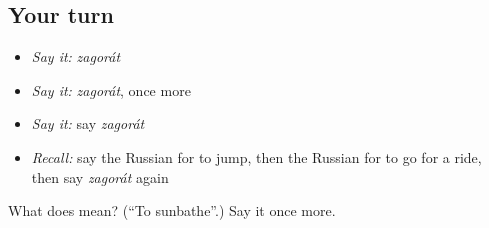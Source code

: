 \subsection*{Your turn}
\begin{itemize}
\raggedright
  \item \emph{Say it:} \emph{zagorát}
  \item \emph{Say it:} \emph{zagorát}, once more
  \item \emph{Say it:} say \emph{zagorát}
  \item \emph{Recall:} say the Russian for to jump, then the Russian for to go for a ride, then say \emph{zagorát} again
\end{itemize}

\begin{tcolorbox}[breakable,colback=teal!4,colframe=teal!35!black,title={Before you move on}]
What does  mean? (\textquotedblleft{}To sunbathe\textquotedblright{}.) Say it once more.
\end{tcolorbox}

